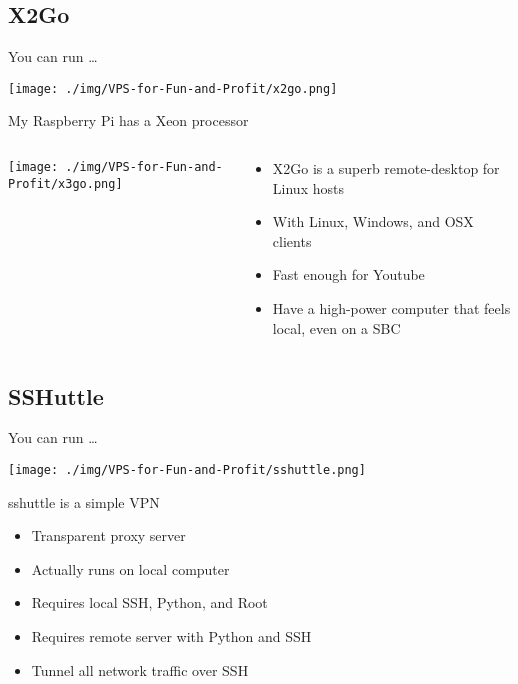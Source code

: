 \documentclass[presentation,aspectratio=169]{beamer}
\begin{document}
\subsection{X2Go}
\label{sec-4-5}
\begin{frame}[label=sec-4-5-1]{You can run \ldots{}}
\begin{center}
\texttt{[image: ./img/VPS-for-Fun-and-Profit/x2go.png]}
\end{center}
\end{frame}
\begin{frame}[label=sec-4-5-2]{My Raspberry Pi has a Xeon processor}
\begin{columns}
\begin{column}{0.6\textwidth}

\texttt{[image: ./img/VPS-for-Fun-and-Profit/x3go.png]}
\end{column}

\begin{column}{0.35\textwidth}

\begin{itemize}
\item X2Go is a superb remote-desktop for Linux hosts
\item With Linux, Windows, and OSX clients
\item Fast enough for Youtube
\item Have a high-power computer that feels local, even on a SBC
\end{itemize}
\end{column}
\end{columns}
\end{frame}

\subsection{SSHuttle}
\label{sec-4-6}
\begin{frame}[label=sec-4-6-1]{You can run \ldots{}}
\begin{center}
\texttt{[image: ./img/VPS-for-Fun-and-Profit/sshuttle.png]}
\end{center}
\end{frame}
\begin{frame}[label=sec-4-6-2]{sshuttle is a simple VPN}
\begin{itemize}
\item Transparent proxy server
\item Actually runs on local computer
\item Requires local SSH, Python, and Root
\item Requires remote server with Python and SSH
\item Tunnel all network traffic over SSH
\end{itemize}
\end{frame}
\end{document}
